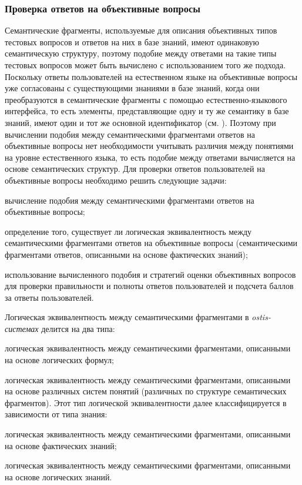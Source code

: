 \subsubsection{Проверка ответов на объективные вопросы}
\label{subsubsec_checking_answers_objective_questions}

Семантические фрагменты, используемые для описания объективных типов тестовых вопросов и ответов на них в базе знаний, имеют одинаковую семантическую структуру, поэтому подобие между ответами на такие типы тестовых вопросов может быть вычислено с использованием того же подхода. Поскольку ответы пользователей на естественном языке на объективные вопросы уже согласованы с существующими знаниями в базе знаний, когда они преобразуются в семантические фрагменты с помощью естественно-языкового интерфейса, то есть элементы, представляющие одну и ту же семантику в базе знаний, имеют один и тот же основной идентификатор (см. ). Поэтому при вычислении подобия между семантическими фрагментами ответов на объективные вопросы нет необходимости учитывать различия между понятиями на уровне естественного языка, то есть подобие между ответами вычисляется на основе семантических структур. Для проверки ответов пользователей на объективные вопросы необходимо решить следующие задачи:

\begin{textitemize}
	\item вычисление подобия между семантическими фрагментами ответов на объективные вопросы;
	\item определение того, существует ли логическая эквивалентность между семантическими фрагментами ответов на объективные вопросы (семантическими фрагментами ответов, описанными на основе фактических знаний);
	\item использование вычисленного подобия и стратегий оценки объективных вопросов для проверки правильности и полноты ответов пользователей и подсчета баллов за ответы пользователей.
\end{textitemize}

Логическая эквивалентность между семантическими фрагментами в \textit{ostis-системах} делится на два типа:

\begin{textitemize}
	\item логическая эквивалентность между семантическими фрагментами, описанными на основе логических формул;
	\item логическая эквивалентность между семантическими фрагментами, описанными на основе различных систем понятий (различных по структуре семантических фрагментов). Этот тип логической эквивалентности далее классифицируется в зависимости от типа знания:
	
	\begin{textitemize}
		\item логическая эквивалентность между семантическими фрагментами, описанными на основе фактических знаний;
		\item логическая эквивалентность между семантическими фрагментами, описанными на основе логических знаний.
	\end{textitemize}
	
\end{textitemize}

